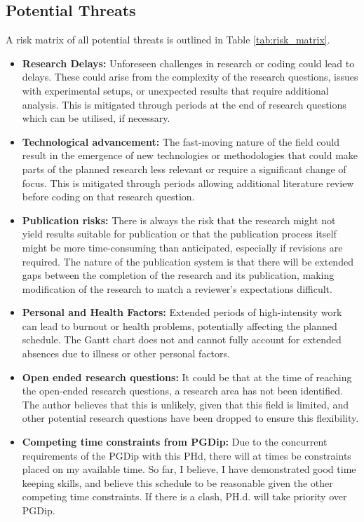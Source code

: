 \documentclass[../main.tex]{subfiles}
\begin{document}
\subsection{Potential Threats}

A risk matrix of all potential threats is outlined in Table \ref{tab:risk_matrix}.

\begin{itemize}
    \item \textbf{Research Delays:} Unforeseen challenges in research or coding could lead to delays. These could arise from the complexity of the research questions, issues with experimental setups, or unexpected results that require additional analysis. This is mitigated through periods at the end of research questions which can be utilised, if necessary.
    \item \textbf{Technological advancement:} The fast-moving nature of the field could result in the emergence of new technologies or methodologies that could make parts of the planned research less relevant or require a significant change of focus. This is mitigated through periods allowing additional literature review before coding on that research question.
    \item \textbf{Publication risks:} There is always the risk that the research might not yield results suitable for publication or that the publication process itself might be more time-consuming than anticipated, especially if revisions are required. The nature of the publication system is that there will be extended gaps between the completion of the research and its publication, making modification of the research to match a reviewer's expectations difficult.
    \item \textbf{Personal and Health Factors:} Extended periods of high-intensity work can lead to burnout or health problems, potentially affecting the planned schedule. The Gantt chart does not and cannot fully account for extended absences due to illness or other personal factors.
    \item \textbf{Open ended research questions:} It could be that at the time of reaching the open-ended research questions, a research area has not been identified. The author believes that this is unlikely, given that this field is limited, and other potential research questions have been dropped to ensure this flexibility.
    \item \textbf{Competing time constraints from PGDip:} Due to the concurrent requirements of the PGDip with this PHd, there will at times be constraints placed on my available time. So far, I believe, I have demonstrated good time keeping skills, and believe this schedule to be reasonable given the other competing time constraints. If there is a clash, PH.d. will take priority over PGDip.
\end{itemize}
\end{document}
